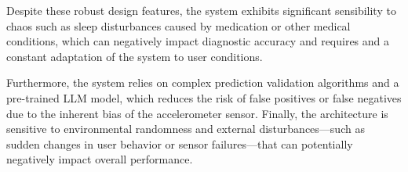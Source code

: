 \documentclass[conference]{IEEEtran}
\begin{document}
	Despite these robust design features, the system exhibits significant sensibility to chaos such as sleep disturbances
	caused by medication or other medical conditions, which can negatively impact diagnostic accuracy and requires and 
	a constant adaptation of the system to user conditions.
	
	Furthermore, the system relies on complex prediction validation algorithms and a pre-trained LLM model, which reduces
	the risk of false positives or false negatives due to the inherent bias of the accelerometer sensor. Finally, the
	architecture is sensitive to environmental randomness and external disturbances—such as sudden changes in user behavior
	or sensor failures—that can potentially negatively impact overall performance.



\end{document}
